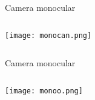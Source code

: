 \begin{frame}[t]{Camera monocular}
    \transboxout[duration=0.5]
    \begin{columns}
            \texttt{[image: monocan.png]}
    \end{columns}
\end{frame}
\begin{frame}[t]{Camera monocular}
    \transboxout[duration=0.5]
    \begin{columns}
            \texttt{[image: monoo.png]}
    \end{columns}
\end{frame}

